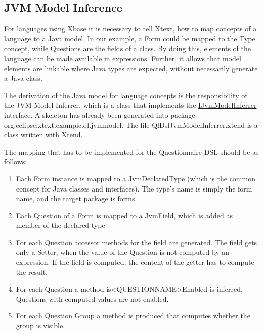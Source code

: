 \subsection{JVM Model Inference}

For languages using Xbase it is necessary to tell Xtext, how to map concepts of a language to a Java model. In our example,
a Form could be mapped to the Type concept, while Questions are the fields of a class. By doing this, elements of the language
can be made available in expressions. Further, it allows that model elements are linkable where Java types are expected, without
necessarily generate a Java class.

The derivation of the Java model for language concepts is the responsibility of the JVM Model Inferrer, which is a class that implements
the \href{http://download.eclipse.org/modeling/tmf/xtext/javadoc/2.3/org/eclipse/xtext/xbase/jvmmodel/IJvmModelInferrer.html}{IJvmModelInferrer} interface.
A skeleton has already been generated into package org.eclipse.xtext.example.ql.jvmmodel. The file QlDslJvmModelInferrer.xtend is a class
written with Xtend.



The mapping that has to be implemented for the Questionnaire DSL should be as follows:
\begin{enumerate}
  \item Each Form instance is mapped to a JvmDeclaredType (which is the common concept for Java classes and interfaces).
  The type's name is simply the form name, and the target package is forms.
  \item Each Question of a Form is mapped to a JvmField, which is added as member of the declared type
  \item For each Question accessor methods for the field are generated. The field gets only a Setter, when the value of the Question is
  not computed by an expression. If the field is computed, the content of the getter has to compute the result.
  \item For each Question a method is<QUESTIONNAME>Enabled is inferred.
  Questions with computed values are not enabled.
  \item For each Question Group a method is produced that computes whether the
  group is visible. 
\end{enumerate}

